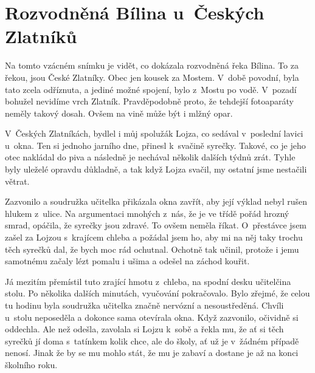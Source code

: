 
\chapter{Rozvodněná Bílina u~Českých Zlatníků}

Na tomto vzácném snímku je vidět, co dokázala rozvodněná řeka Bílina. To za
řekou, jsou České Zlatníky. Obec jen kousek za Mostem. V~době povodní, byla
tato zcela odříznuta, a jediné možné spojení, bylo z~Mostu po vodě. V~pozadí
bohužel nevidíme vrch Zlatník. Pravděpodobně proto, že tehdejší fotoaparáty
neměly takový dosah. Ovšem na vině může být i mlžný opar.

V~Českých Zlatníkách, bydlel i můj spolužák Lojza, co sedával v~poslední lavici
u~okna. Ten si jednoho jarního dne, přinesl k~svačině syrečky. Takové, co je
jeho otec nakládal do piva a následně je nechával několik dalších týdnů zrát.
Tyhle byly uleželé opravdu důkladně, a tak když Lojza svačil, my ostatní jsme
nestačili větrat.

Zazvonilo a soudružka učitelka přikázala okna zavřít, aby její výklad nebyl
rušen hlukem z~ulice. Na argumentaci mnohých z~nás, že je ve třídě pořád hrozný
smrad, opáčila, že syrečky jsou zdravé. To ovšem neměla říkat. O~přestávce jsem
zašel za Lojzou s~krajícem chleba a požádal jsem ho, aby mi na něj taky trochu
těch syrečků dal, že bych moc rád ochutnal. Ochotně tak učinil, protože i jemu
samotnému začaly lézt pomalu i ušima a odešel na záchod kouřit.

Já mezitím přemístil tuto zrající hmotu z~chleba, na spodní desku učitelčina
stolu. Po několika dalších minutách, vyučování pokračovalo. Bylo zřejmé, že
celou tu hodinu byla soudružka učitelka značně nervózní a nesoustředěná. Chvíli
u~stolu neposeděla a dokonce sama otevírala okna. Když zazvonilo, očividně si
oddechla. Ale než odešla, zavolala si Lojzu k~sobě a řekla mu, že ať si těch
syrečků jí doma s~tatínkem kolik chce, ale do školy, ať už je v~žádném případě
nenosí. Jinak že by se mu mohlo stát, že mu je zabaví a dostane je až na konci
školního roku.

